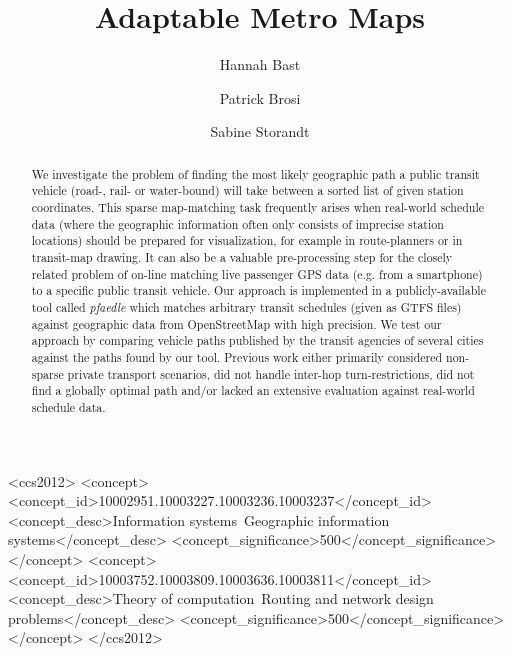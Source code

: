 \documentclass[sigconf]{acmart}
\begin{document}
\title{Adaptable Metro Maps}

\author{Hannah Bast}

\author{Patrick Brosi}

\author{Sabine Storandt}

\begin{abstract}
We investigate the problem of finding the most likely geographic path a public transit vehicle (road-, rail- or water-bound) will take between a sorted list of given station coordinates. This sparse map-matching task frequently arises when real-world schedule data (where the geographic information often only consists of imprecise station locations) should be prepared for visualization, for example in route-planners or in transit-map drawing. It can also be a valuable pre-processing step for the closely related problem of on-line matching live passenger GPS data (e.g. from a smartphone) to a specific public transit vehicle. Our approach is implemented in a publicly-available tool called \emph{pfaedle} which matches arbitrary transit schedules (given as GTFS files) against geographic data from OpenStreetMap with high precision. We test our approach by comparing vehicle paths published by the transit agencies of several cities against the paths found by our tool. Previous work either primarily considered non-sparse private transport scenarios, did not handle inter-hop turn-restrictions, did not find a globally optimal path and/or lacked an extensive evaluation against real-world schedule data.
\end{abstract}

%
%
\begin{CCSXML}
<ccs2012>
<concept>
<concept_id>10002951.10003227.10003236.10003237</concept_id>
<concept_desc>Information systems~Geographic information systems</concept_desc>
<concept_significance>500</concept_significance>
</concept>
<concept>
<concept_id>10003752.10003809.10003636.10003811</concept_id>
<concept_desc>Theory of computation~Routing and network design problems</concept_desc>
<concept_significance>500</concept_significance>
</concept>
</ccs2012>
\end{CCSXML}
\end{document}

